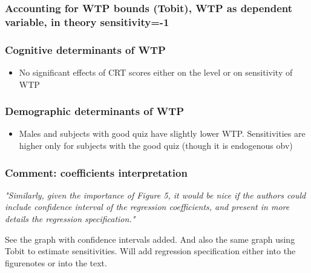 \documentclass[11pt,hyperref={bookmarks=false}]{beamer}
\begin{document}
\begin{frame}
\frametitle{Accounting for WTP bounds (Tobit), WTP as dependent variable, in theory sensitivity=-1}
\begin{table}[htbp!]
\centering
{}
\end{table}	
\end{frame}






\begin{frame}
\frametitle{Cognitive determinants of WTP}
\begin{itemize}
\item No significant effects of CRT scores either on the level or on sensitivity of WTP
\end{itemize}
\footnotesize
{}

\end{frame}

\begin{frame}
\frametitle{Demographic determinants of WTP}
\footnotesize
\begin{itemize}
\item Males and subjects with good quiz have slightly lower WTP. Sensitivities are higher only for subjects with the good  quiz (though it is endogenous obv)
\end{itemize}

\end{frame}




\begin{frame}
\frametitle{Comment: coefficients interpretation}
\footnotesize
\parbox{\textwidth}{

\textit{"Similarly, given the importance of Figure 5, it would be nice if the authors could
include confidence interval of the regression coefficients, and present in more details
the regression specification."}
}

\parbox{\textwidth}{

See the graph with confidence intervals added. And also the same graph using Tobit to estimate sensitivities. Will add regression specification either into the figurenotes or into the text.
}


\end{frame}
\end{document}
